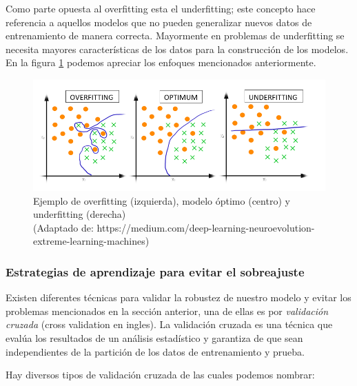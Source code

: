 Como parte opuesta al overfitting esta el  underfitting; este concepto hace referencia a aquellos modelos que no pueden generalizar nuevos datos de entrenamiento de manera correcta. Mayormente en problemas de underfitting se necesita mayores características de los datos para la construcción de los modelos. En la figura \ref{Fig: overUnder} podemos apreciar los enfoques mencionados anteriormente.

\begin{figure}[h]
 \centering
  \includegraphics[scale=0.4,keepaspectratio=true,clip=true]{imagenes/MarcoTeorico/OverFUnderF.png}
  \caption{Ejemplo de overfitting (izquierda), modelo óptimo (centro) y underfitting (derecha) \\ 
  (Adaptado de: https://medium.com/deep-learning-neuroevolution-extreme-learning-machines)}
	\label{Fig: overUnder}
\end{figure}



\subsubsection{Estrategias de aprendizaje para evitar el sobreajuste}
Existen diferentes técnicas para validar la robustez de nuestro modelo y evitar los problemas mencionados en la sección anterior, una de ellas es por  \textit{validación cruzada} (cross validation en ingles). La validación cruzada es una técnica que evalúa los resultados de un análisis estadístico y garantiza de que sean independientes de la partición de los datos de entrenamiento y prueba. 

Hay diversos tipos de validación cruzada de las cuales podemos nombrar:


